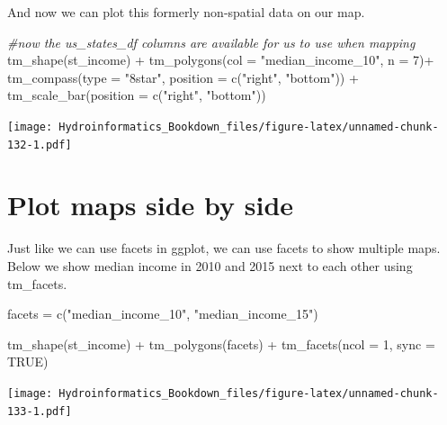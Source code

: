 \documentclass[
]{book}
\newenvironment{Shaded}{\begin{snugshade}}{\end{snugshade}}
\newcommand{\AttributeTok}[1]{\textcolor[rgb]{0.77,0.63,0.00}{#1}}
\newcommand{\CommentTok}[1]{\textcolor[rgb]{0.56,0.35,0.01}{\textit{#1}}}
\newcommand{\ConstantTok}[1]{\textcolor[rgb]{0.00,0.00,0.00}{#1}}
\newcommand{\DecValTok}[1]{\textcolor[rgb]{0.00,0.00,0.81}{#1}}
\newcommand{\FunctionTok}[1]{\textcolor[rgb]{0.00,0.00,0.00}{#1}}
\newcommand{\NormalTok}[1]{#1}
\newcommand{\OtherTok}[1]{\textcolor[rgb]{0.56,0.35,0.01}{#1}}
\newcommand{\SpecialCharTok}[1]{\textcolor[rgb]{0.00,0.00,0.00}{#1}}
\newcommand{\StringTok}[1]{\textcolor[rgb]{0.31,0.60,0.02}{#1}}
\begin{document}
And now we can plot this formerly non-spatial data on our map.

\begin{Shaded}
\begin{Highlighting}[]
\CommentTok{\#now the us\_states\_df columns are available for us to use when mapping}
\FunctionTok{tm\_shape}\NormalTok{(st\_income) }\SpecialCharTok{+} 
  \FunctionTok{tm\_polygons}\NormalTok{(}\AttributeTok{col =} \StringTok{"median\_income\_10"}\NormalTok{, }\AttributeTok{n =} \DecValTok{7}\NormalTok{)}\SpecialCharTok{+} 
  \FunctionTok{tm\_compass}\NormalTok{(}\AttributeTok{type =} \StringTok{"8star"}\NormalTok{, }\AttributeTok{position =} \FunctionTok{c}\NormalTok{(}\StringTok{"right"}\NormalTok{, }\StringTok{"bottom"}\NormalTok{)) }\SpecialCharTok{+}
  \FunctionTok{tm\_scale\_bar}\NormalTok{(}\AttributeTok{position =} \FunctionTok{c}\NormalTok{(}\StringTok{"right"}\NormalTok{, }\StringTok{"bottom"}\NormalTok{))}
\end{Highlighting}
\end{Shaded}

\texttt{[image: Hydroinformatics\_Bookdown\_files/figure-latex/unnamed-chunk-132-1.pdf]}

\hypertarget{plot-maps-side-by-side}{%
\section{Plot maps side by side}\label{plot-maps-side-by-side}}

Just like we can use facets in ggplot, we can use facets to show multiple maps. Below we show median income in 2010 and 2015 next to each other using tm\_facets.

\begin{Shaded}
\begin{Highlighting}[]
\NormalTok{facets }\OtherTok{=} \FunctionTok{c}\NormalTok{(}\StringTok{"median\_income\_10"}\NormalTok{, }\StringTok{"median\_income\_15"}\NormalTok{)}

\FunctionTok{tm\_shape}\NormalTok{(st\_income) }\SpecialCharTok{+} 
  \FunctionTok{tm\_polygons}\NormalTok{(facets) }\SpecialCharTok{+} 
  \FunctionTok{tm\_facets}\NormalTok{(}\AttributeTok{ncol =} \DecValTok{1}\NormalTok{, }\AttributeTok{sync =} \ConstantTok{TRUE}\NormalTok{)}
\end{Highlighting}
\end{Shaded}

\texttt{[image: Hydroinformatics\_Bookdown\_files/figure-latex/unnamed-chunk-133-1.pdf]}
\end{document}
